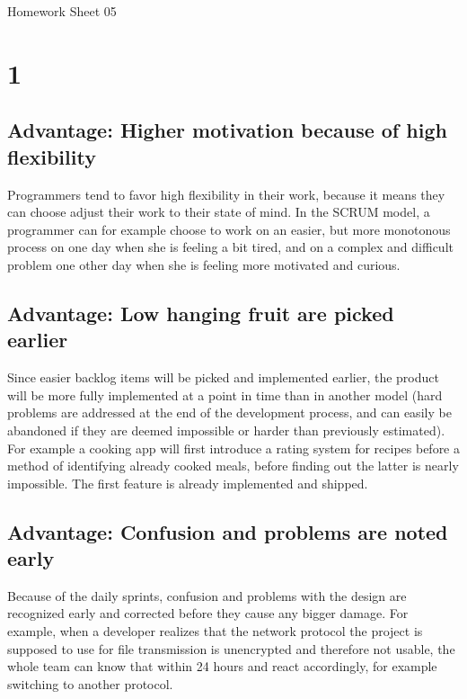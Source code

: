 \documentclass[11pt,a4paper]{article}
\begin{document}
\begin{center}
{\Large Homework Sheet 05}
\end{center}

\thispagestyle{empty}
\pagestyle{empty}

\section*{1}

\subsection*{Advantage: Higher motivation because of high flexibility}

Programmers tend to favor high flexibility in their work, because it
means they can choose adjust their work to their state of mind. In the
SCRUM model, a programmer can for example choose to work on an easier,
but more monotonous process on one day when she is feeling a bit tired,
and on a complex and difficult problem one other day when she is feeling
more motivated and curious.

\subsection*{Advantage: Low hanging fruit are picked earlier}

Since easier backlog items will be picked and implemented earlier, the
product will be more fully implemented at a point in time than in another
model (hard problems are addressed at the end of the development process,
and can easily be abandoned if they are deemed impossible or harder than
previously estimated). For example a cooking app will first introduce
a rating system for recipes before a method of identifying already cooked
meals, before finding out the latter is nearly impossible. The first feature
is already implemented and shipped.

\subsection*{Advantage: Confusion and problems are noted early}

Because of the daily sprints, confusion and problems with the design are
recognized early and corrected before they cause any bigger damage.
For example, when a developer realizes that the network protocol the
project is supposed to use for file transmission is unencrypted
and therefore not usable, the whole team can know that within 24 hours
and react accordingly, for example switching to another protocol.
\end{document}
